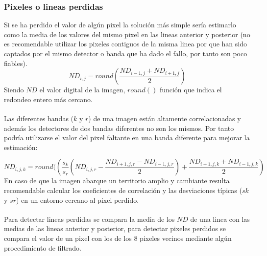 \subsubsection{Pixeles o lineas perdidas}
Si se ha perdido el valor de alg\'un pixel la solución m\'as simple ser\'ia estimarlo como la media de los valores
del mismo pixel en las lineas anterior y posterior (no es recomendable utilizar los pixeles contiguos de la misma linea por que han sido captados por el mismo detector o banda que ha dado el fallo, por tanto son
poco fiables).
		\begin{equation}
		ND_{i,j} = round(\dfrac{ND_{i-1,j} + ND_{i+1,j}}{2})
		\end{equation} 
Siendo $ ND $ el valor digital de la imagen, $ round() $ funci\'on que indica el redondeo entero m\'as cercano.\\~\\
Las diferentes bandas ($ k $ y $ r $) de una imagen están altamente correlacionadas y adem\'as los detectores de dos bandas diferentes no son los mismos. Por tanto podría utilizarse el valor del pixel faltante en una banda diferente para mejorar la estimaci\'on:

		\begin{equation}
		ND_{i,j,k} = round((\dfrac{s_{k}}{s_{r}}(ND_{i,j,r}-\dfrac{ND_{i+1,j,r} - ND_{i-1,j,r}}{2}) + \dfrac{ND_{i+1,j,k} + ND_{i-1,j,k}}{2})
		\end{equation} 	
En caso de que la imagen abarque un territorio amplio y cambiante resulta recomendable calcular los coeficientes de correlaci\'on y las desviaciones t\'ipicas ($ sk $ y $ sr $) en un entorno cercano al pixel perdido.\\~\\
Para detectar lineas perdidas se compara la media de los $ ND $ de una linea con las medias de las lineas anterior y posterior, para detectar pixeles perdidos se compara el valor de un pixel con los de los 8 pixeles vecinos mediante alg\'un procedimiento de filtrado.
